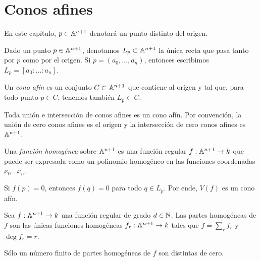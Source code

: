 \section{Conos afines}

\begin{preliminaries}
En este capítulo, $p \in \mathbb A^{n+1}$ denotará un punto distinto del origen.
\end{preliminaries}

\begin{notation}
Dado un punto $p \in \mathbb A^{n+1}$, denotamos $L_p \subset \mathbb A^{n+1}$ la única recta que pasa tanto por $p$ como por el origen. Si $p = (a_0, \dots, a_n)$, entonces escribimos $L_p = [a_0 : \dots : a_n]$.
\end{notation}

\begin{definition}
Un \textit{cono afín} es un conjunto $C \subset \mathbb A^{n+1}$ que contiene al origen y tal que, para todo punto $p \in C$, tenemos también $L_p \subset C$.
\end{definition}

\begin{remark}
Toda unión e intersección de conos afines es un cono afín. Por convención, la unión de cero conos afines es el origen y la intersección de cero conos afines es $\mathbb A^{n+1}$.
\end{remark}

\begin{definition}
Una \textit{función homogénea} sobre $\mathbb A^{n+1}$ es una función regular $f : \mathbb A^{n+1} \to k$ que puede ser expresada como un polinomio homogéneo en las funciones coordenadas $x_0 \dots x_n$.
\end{definition}

\begin{remark}
Si $f(p) = 0$, entonces $f(q) = 0$ para todo $q \in L_p$. Por ende, $V(f)$ es un cono afín.
\end{remark}

\begin{definition}
Sea $f : \mathbb A^{n+1} \to k$ una función regular de grado $d \in \mathbb N$. Las partes homogéneas de $f$ son las únicas funciones homogéneas $f_r : \mathbb A^{n+1} \to k$ tales que $f = \sum_r f_r$ y $\deg f_r = r$.
\end{definition}

\begin{remark}
Sólo un número finito de partes homogéneas de $f$ son distintas de cero.
\end{remark}

